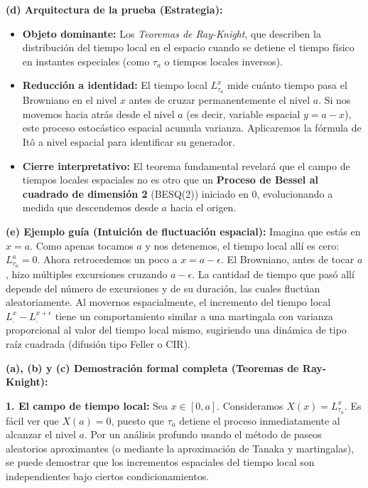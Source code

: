 \documentclass[11pt, letterpaper]{article}
\begin{document}
\vspace{5mm}

\begin{solucion}
    \textbf{(d) Arquitectura de la prueba (Estrategia):}
    \begin{itemize}
        \item[(i)] \textbf{Objeto dominante:} Los \textit{Teoremas de Ray-Knight}, que describen la distribución del tiempo local en el espacio cuando se detiene el tiempo físico en instantes especiales (como $\tau_a$ o tiempos locales inversos).
        \item[(ii)] \textbf{Reducción a identidad:} El tiempo local $L_{\tau_a}^x$ mide cuánto tiempo pasa el Browniano en el nivel $x$ antes de cruzar permanentemente el nivel $a$. Si nos movemos hacia atrás desde el nivel $a$ (es decir, variable espacial $y = a - x$), este proceso estocástico espacial acumula varianza. Aplicaremos la fórmula de Itô a nivel espacial para identificar su generador.
        \item[(iii)] \textbf{Cierre interpretativo:} El teorema fundamental revelará que el campo de tiempos locales espaciales no es otro que un \textbf{Proceso de Bessel al cuadrado de dimensión 2} (BESQ(2)) iniciado en 0, evolucionando a medida que descendemos desde $a$ hacia el origen.
    \end{itemize}

    \vspace{3mm}
    \textbf{(e) Ejemplo guía (Intuición de fluctuación espacial):}
    Imagina que estás en $x=a$. Como apenas tocamos $a$ y nos detenemos, el tiempo local allí es cero: $L_{\tau_a}^a = 0$.
    Ahora retrocedemos un poco a $x = a - \epsilon$. El Browniano, antes de tocar $a$, hizo múltiples excursiones cruzando $a-\epsilon$. La cantidad de tiempo que pasó allí depende del número de excursiones y de su duración, las cuales fluctúan aleatoriamente. Al movernos espacialmente, el incremento del tiempo local $L^{x}_{.} - L^{x+\epsilon}_{.}$ tiene un comportamiento similar a una martingala con varianza proporcional al valor del tiempo local mismo, sugiriendo una dinámica de tipo raíz cuadrada (difusión tipo Feller o CIR).

    \textbf{(a), (b) y (c) Demostración formal completa (Teoremas de Ray-Knight):}

    \textbf{1. El campo de tiempo local:}
    Sea $x \in [0, a]$. Consideramos $X(x) = L_{\tau_a}^x$.
    Es fácil ver que $X(a) = 0$, puesto que $\tau_a$ detiene el proceso inmediatamente al alcanzar el nivel $a$.
    Por un análisis profundo usando el método de paseos aleatorios aproximantes (o mediante la aproximación de Tanaka y martingalas), se puede demostrar que los incrementos espaciales del tiempo local son independientes bajo ciertos condicionamientos.


\end{solucion}
\end{document}
